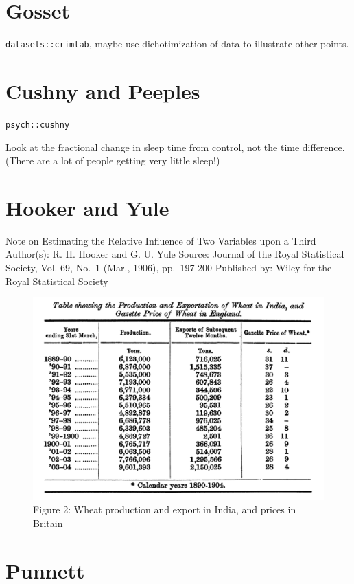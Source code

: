 \documentclass[]{tufte-book}
\begin{document}
\hypertarget{gosset}{%
\section{Gosset}\label{gosset}}

\texttt{datasets::crimtab}, maybe use dichotimization of data to illustrate other points.

\hypertarget{cushny-and-peeples}{%
\section{Cushny and Peeples}\label{cushny-and-peeples}}

\texttt{psych::cushny}

Look at the fractional change in sleep time from control, not the time difference. (There are a lot of people getting very little sleep!)

\hypertarget{hooker-and-yule}{%
\section{Hooker and Yule}\label{hooker-and-yule}}

Note on Estimating the Relative Influence of Two Variables upon a Third
Author(s): R. H. Hooker and G. U. Yule
Source: Journal of the Royal Statistical Society, Vol. 69, No.~1 (Mar., 1906), pp.~197-200 Published by: Wiley for the Royal Statistical Society

\begin{figure}\includegraphics[width=0.8\linewidth]{images/india-exports-yule} \caption[Figure 2]{Figure 2: Wheat production and export in India, and prices in Britain}\label{yule-exports}
\end{figure}

\hypertarget{punnett}{%
\section{Punnett}\label{punnett}}
\end{document}
